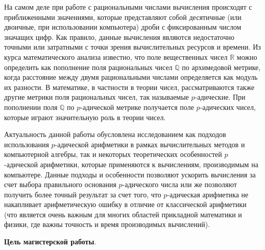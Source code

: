 \documentclass[master, och, autoref, times]{sty/SCWorks}
\theoremstyle{plain}
\theoremstyle{definition}
\numberwithin{equation}{section}
\begin{document}
На самом деле при работе с рациональными числами вычисления происходят с приближенными значениями, которые представляют собой десятичные (или двоичные, при использовании компьютера) дроби с фиксированным числом значащих цифр.  Как правило, данные вычисления являются недостаточно точными или затратными с точки зрения вычислительных ресурсов и времени.
Из курса математического анализа известно, что поле вещественных чисел $\mathbb{R}$ можно определить как пополнение поля рациональных чисел $\mathbb{Q}$ по архимедовой метрике, когда расстояние между двумя рациональными числами определяется как модуль их разности. В математике, в частности в теории чисел, рассматриваются также другие метрики поля рациональных чисел, так называемые $p$-адические. При пополнении поля $\mathbb{Q}$ по $p$-адической метрике получается поле $p$-адических чисел, которые играют значительную роль в теории чисел.

Актуальность данной работы обусловлена исследованием как подходов использования $p$-адической арифметики в рамках вычислительных методов и компьютерной алгебры, так и некоторых теоретических особенностей $p$-адической арифметики, которые применяются к вычислениям, производимым на компьютере. Данные подходы и особенности позволяют ускорить вычисления за счет выбора правильного основания $p$-адического числа или же  позволяют получить более точный результат за счет того, что $p$-адическая арифметика не накапливает арифметическую ошибку в отличие от классической арифметики (что является очень важным для многих областей прикладной математики и физики, где важны точность и время производимых вычислений).


\textbf{Цель магистерской работы}.
\end{document}
